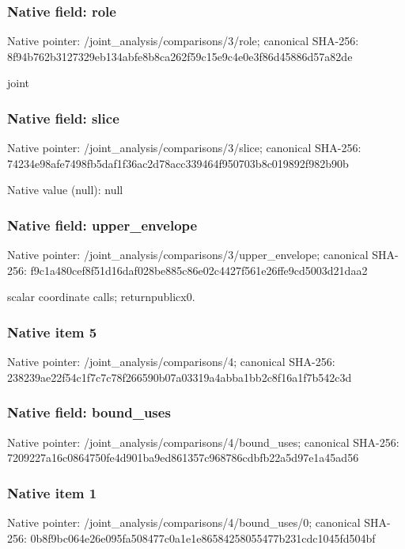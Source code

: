 \documentclass[10pt,a4paper]{article}
\begin{document}
\subsubsection{Native field: role}
Native pointer: /joint\_\allowbreak{}analysis/comparisons/3/role; canonical SHA-256: 8f94b762b3127329eb134abfe8b8ca262f59c15e9c4e0e3f86d45886d57a82de

\begingroup\raggedright\sloppy joint\par\endgroup

\subsubsection{Native field: slice}
Native pointer: /joint\_\allowbreak{}analysis/comparisons/3/slice; canonical SHA-256: 74234e98afe7498fb5daf1f36ac2d78acc339464f950703b8c019892f982b90b

Native value (null): null

\subsubsection{Native field: upper\_\allowbreak{}envelope}
Native pointer: /joint\_\allowbreak{}analysis/comparisons/3/upper\_\allowbreak{}envelope; canonical SHA-256: f9c1a480cef8f51d16daf028be885c86e02c4427f561e26ffe9cd5003d21daa2

\begingroup\raggedright{} scalar coordinate calls;\allowbreak{} returnpublicx0.\par\endgroup

\subsubsection{Native item 5}
Native pointer: /joint\_\allowbreak{}analysis/comparisons/4; canonical SHA-256: 238239ae22f54c1f7c7c78f266590b07a03319a4abba1bb2c8f16a1f7b542c3d

\subsubsection{Native field: bound\_\allowbreak{}uses}
Native pointer: /joint\_\allowbreak{}analysis/comparisons/4/bound\_\allowbreak{}uses; canonical SHA-256: 7209227a16c0864750fe4d901ba9ed861357c968786cdbfb22a5d97e1a45ad56

\subsubsection{Native item 1}
Native pointer: /joint\_\allowbreak{}analysis/comparisons/4/bound\_\allowbreak{}uses/0; canonical SHA-256: 0b8f9bc064e26e095fa508477c0a1e1e86584258055477b231cdc1045fd504bf
\end{document}
